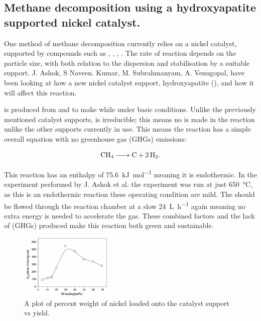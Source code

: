 \subsection{Methane decomposition using a hydroxyapatite supported nickel catalyst.}%
\label{sub:methane_decomposition_using_a_hydroxyapatite_supported_nickel_catalyst_}
One method of methane decomposition currently relies on a nickel catalyst, supported by compounds such as , , , .
The rate of reaction depends on the  particle size, with both relation to the dispersion and stabilisation by a suitable support\cite{Ashok}.
 J. Ashok, S Naveen. Kumar, M. Subrahmanyam, A. Venugopal, have been looking at how a new nickel catalyst support, hydroxyapatite (), and how it will affect this reaction.

  is produced from  and  to make \ce{[Ca5(PO4)3(OH)]} while under basic conditions\cite{Ashok}.
Unlike the previously mentioned catalyst supports,  is irreducible; this means no  is made in the reaction unlike the other supports currently in use.
This means the reaction has a simple overall equation with no greenhouse gas (GHGs) emissions:

\begin{align}
	\ce{CH4 -> C +2H2}
.\end{align}

This reaction has an enthalpy of \SI{75.6}{\kilo\joule\per\mole} meaning it is endothermic.
In the experiment performed by J. Ashok et al. the experiment was run at just \SI{650}{\celsius}\cite{Ashok}, as this is an endothermic reaction these operating condition are mild.
The  should be flowed through the reaction chamber at a slow \SI{24}{\liter\per\hour}\cite{Ashok} again meaning no extra energy is needed to accelerate the gas.
These combined factors and the lack of (GHGs) produced make this reaction both green and sustainable.

\begin{figure}[H]
	\centering
	\includegraphics[width=0.4\textwidth]{539a7840-2cb8-11eb-895f-8c8590753a48.png}
	\caption{A plot of percent weight of nickel loaded onto the catalyst support vs  yield.}  
	\label{fig:MD_plot1}
\end{figure}

